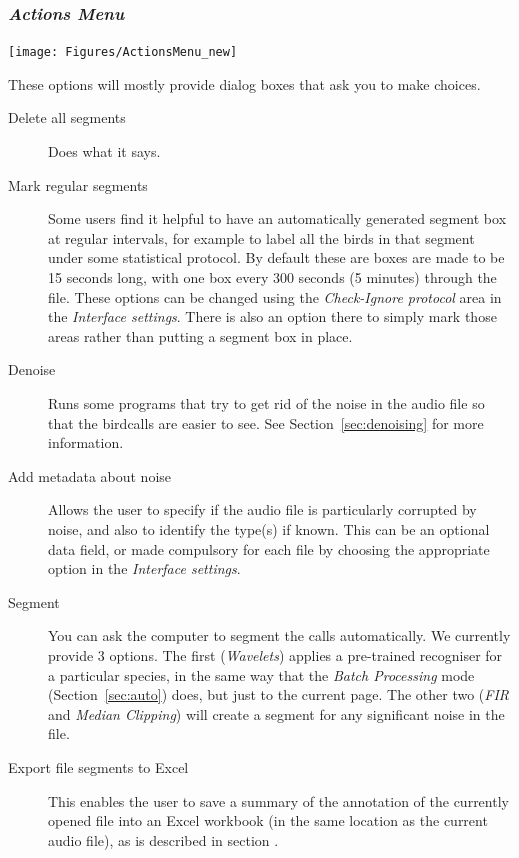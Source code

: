\documentclass{scrartcl}
\begin{document}
\subsubsection{\textit{Actions Menu}}
\label{sec:action}

\begin{center}
\texttt{[image: Figures/ActionsMenu\_new]}
\end{center}

These options will mostly provide dialog boxes that ask you to make choices. 

\begin{description}
\item [Delete all segments] Does what it says. 
\item [Mark regular segments] Some users find it helpful to have an automatically generated segment box at regular intervals, for example to label all the birds in that segment under some statistical protocol. By default these are boxes are made to be 15 seconds long, with one box every 300 seconds (5 minutes) through the file. These options can be changed using the \textit{Check-Ignore protocol} area in the \textit{Interface settings}. There is also an option there to simply mark those areas rather than putting a segment box in place.
\item [Denoise] Runs some programs that try to get rid of the noise in the audio file so that the birdcalls are easier to see. %
See Section~\ref{sec:denoising} for more information.
\item [Add metadata about noise] Allows the user to specify if the audio file is particularly corrupted by noise, and also to identify the type(s) if known. This can be an optional data field, or made compulsory for each file by choosing the appropriate option in the \textit{Interface settings}.
\item [Segment] You can ask the computer to segment the calls automatically. We currently provide 3 options. The first (\textit{Wavelets}) applies a pre-trained recogniser for a particular species, in the same way that the \textit{Batch Processing} mode (Section~\ref{sec:auto}) does, but just to the current page. The other two (\textit{FIR} and \textit{Median Clipping}) will create a segment for any significant noise in the file. 
\item [Export file segments to Excel] This enables the user to save a summary of the annotation of the currently opened file into an Excel workbook (in the same location as the current audio file), as is described in section . 

\end{description}
\end{document}
